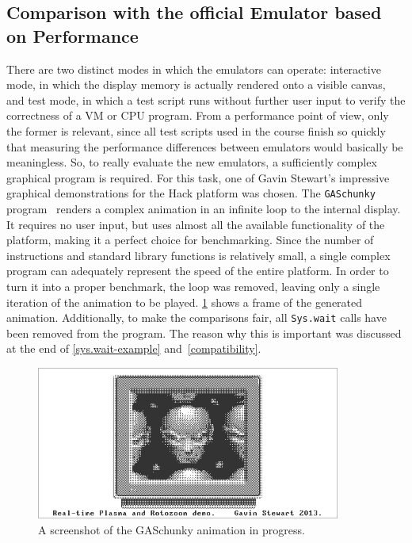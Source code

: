 
\subsection{Comparison with the official Emulator based on Performance} \label{sec:benchmarks}
There are two distinct modes in which the emulators can operate: interactive mode, in which the display memory is actually rendered onto a visible canvas, and test mode, in which a test script runs without further user input to verify the correctness of a VM or CPU program.
From a performance point of view, only the former is relevant, since all test scripts used in the course finish so quickly that measuring the performance differences between emulators would basically be meaningless.
So, to really evaluate the new emulators, a sufficiently complex graphical program is required.
For this task, one of Gavin Stewart's impressive graphical demonstrations for the Hack platform was chosen.
The \verb+GASchunky+ program~\cite{demos} renders a complex animation in an infinite loop to the internal display.
It requires no user input, but uses almost all the available functionality of the platform, making it a perfect choice for benchmarking.
Since the number of instructions and standard library functions is relatively small, a single complex program can adequately represent the speed of the entire platform.
In order to turn it into a proper benchmark, the loop was removed, leaving only a single iteration of the animation to be played.
\cref{fig:gaschunky-screenshot} shows a frame of the generated animation.
Additionally, to make the comparisons fair, all \verb+Sys.wait+ calls have been removed from the program.
The reason why this is important was discussed at the end of \cref{sys.wait-example} and~\cref{compatibility}.
\begin{center}
  \begin{figure}[ht]
    \centering
    \includegraphics[width=10cm]{fig/gaschunky.png}
    \caption{A screenshot of the GASchunky animation in progress.}%
    \label{fig:gaschunky-screenshot}
  \end{figure}
\end{center}
